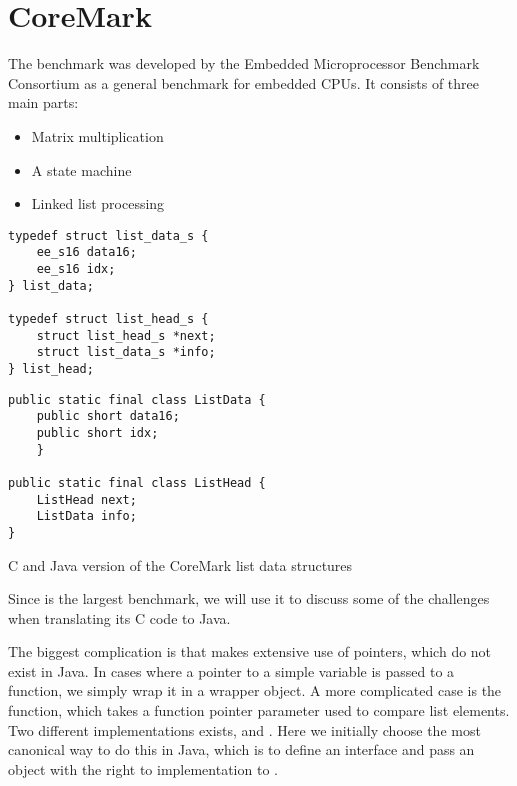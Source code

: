 \section{CoreMark}
\label{sec-evaluation-coremark}

The  benchmark was developed by the Embedded Microprocessor Benchmark Consortium as a general benchmark for embedded CPUs. It consists of three main parts:
\begin{itemize}
  \item Matrix multiplication
  \item A state machine
  \item Linked list processing
\end{itemize}

\begin{listing}[b]
\centering
\begin{minipage}[t]{0.48\textwidth}
\centering
\begin{verbatim}
typedef struct list_data_s {
    ee_s16 data16;
    ee_s16 idx;
} list_data;

typedef struct list_head_s {
    struct list_head_s *next;
    struct list_data_s *info;
} list_head;
\end{verbatim}
\end{minipage}\hfill
\begin{minipage}[t]{0.48\textwidth}
\centering
\begin{verbatim}
public static final class ListData {
    public short data16;
    public short idx;
    }

public static final class ListHead {
    ListHead next;
    ListData info;
}
\end{verbatim}
\end{minipage}
\caption{C and Java version of the CoreMark list data structures}
\label{lst-coremark-list-data-structures}
\end{listing}

Since  is the largest benchmark, we will use it to discuss some of the challenges when translating its C code to Java.

The biggest complication is that  makes extensive use of pointers, which do not exist in Java. In cases where a pointer to a simple variable is passed to a function, we simply wrap it in a wrapper object. A more complicated case is the  function, which takes a function pointer parameter  used to compare list elements. Two different implementations exists,  and . Here we initially choose the most canonical way to do this in Java, which is to define an interface and pass an object with the right to implementation to .

